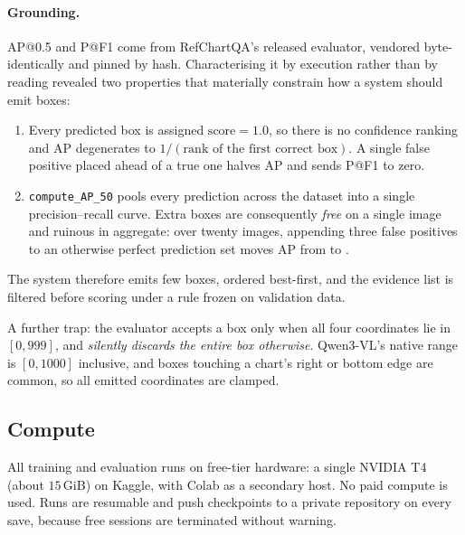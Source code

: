 \paragraph{Grounding.}
AP@0.5 and P@F1 come from RefChartQA's released evaluator, vendored byte-identically and pinned by
hash. Characterising it by execution rather than by reading revealed two properties that materially
constrain how a system should emit boxes:

\begin{enumerate}
  \item Every predicted box is assigned $\mathrm{score}=1.0$, so there is no confidence ranking and
        AP degenerates to $1/(\text{rank of the first correct box})$. A single false positive placed
        ahead of a true one halves AP and sends P@F1 to zero.
  \item \texttt{compute\_AP\_50} pools every prediction across the dataset into a single
        precision--recall curve. Extra boxes are consequently \emph{free} on a single image and
        ruinous in aggregate: over twenty images, appending three false positives to an otherwise
        perfect prediction set moves AP from  to .
\end{enumerate}

The system therefore emits few boxes, ordered best-first, and the evidence list is filtered before
scoring under a rule frozen on validation data.

A further trap: the evaluator accepts a box only when all four coordinates lie in $[0, 999]$, and
\emph{silently discards the entire box otherwise}. Qwen3-VL's native range is $[0,1000]$ inclusive,
and boxes touching a chart's right or bottom edge are common, so all emitted coordinates are clamped.

\subsection{Compute}
\label{sec:setup:compute}

All training and evaluation runs on free-tier hardware: a single NVIDIA T4 (about $15$\,GiB) on
Kaggle, with Colab as a secondary host. No paid compute is used. Runs are resumable and push
checkpoints to a private repository on every save, because free sessions are terminated without
warning.



